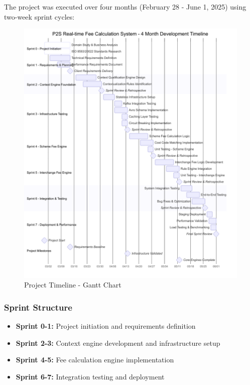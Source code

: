 The project was executed over four months (February 28 - June 1, 2025) using two-week sprint cycles:

\begin{figure}[H]
    \centering
    \includegraphics[width=\textwidth]{img/gantt.png}
    \caption{Project Timeline - Gantt Chart}
    \label{fig:gantt}
\end{figure}

\subsubsection{Sprint Structure}
\begin{itemize}
    \item \textbf{Sprint 0-1:} Project initiation and requirements definition
    \item \textbf{Sprint 2-3:} Context engine development and infrastructure setup
    \item \textbf{Sprint 4-5:} Fee calculation engine implementation
    \item \textbf{Sprint 6-7:} Integration testing and deployment
\end{itemize}

